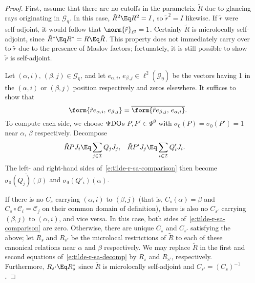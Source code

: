 \documentclass[10pt]{article}
\theoremstyle{plain}
\theoremstyle{definition}
\theoremstyle{remark}
\numberwithin{theorem}{section}
\numberwithin{example}{section}
\numberwithin{equation}{section}
\numberwithin{figure}{section}
\newcommand\PsiDO{\ensuremath{\Psi\text{\normalfont DO}}}	%
\newcommand\sC{\mathscr C}		%
\newcommand\eqml{\Eq}					%
\begin{document}
\begin{proof}	
	First, assume that there are no cutoffs in the parametrix $\tilde R$ due to glancing rays originating in $\mathcal G_\eta$.	In this case, $\tilde R^2\eqml R^2=I$, so $\tilde r^2=I$ likewise. If $\tilde r$ were self-adjoint, it would follow that $\norm{\tilde r}_{\ell^2}=1$. Certainly $\tilde R$ is microlocally self-adjoint, since $\tilde R^*\eqml R^*=R\eqml \tilde R$. This property does not immediately carry over to $\tilde r$ due to the presence of Maslov factors; fortunately, it is still possible to show $\tilde r$ is self-adjoint.
	
	Let $(\alpha,i),\,(\beta,j)\in \mathcal G_{\eta}$, and let $e_{\alpha,i},\,e_{\beta,j}\in \ell^2(\mathcal G_\eta)$ be the vectors having 1 in the $(\alpha,i)$ or $(\beta,j)$ position respectively and zeros elsewhere. It suffices to show that
	\begin{equation}
		\form{\tilde r e_{\alpha,i},\,e_{\beta,j}} = \overline{\form{\tilde r e_{\beta,j},\,e_{\alpha,i}}}.
		\label{e:tilde-r-sa-comparison}
	\end{equation}
	To compute each side, we choose \PsiDO{}s $P,P'\in\Psi^0$ with $\sigma_0(P)=\sigma_0(P')=1$ near $\alpha,\,\beta$ respectively. Decompose
	\begin{align}
		\tilde RPJ_i &\eqml \sum_{j\in\mathcal I} Q_j J_j,		&
		\tilde RP'J_j &\eqml \sum_{i\in\mathcal I} Q'_iJ_i.
		\label{e:tilde-r-sa-decomp}
	\end{align}
	The left- and right-hand sides of~\eqref{e:tilde-r-sa-comparison} then become $\overline{\sigma_0(Q_j)(\beta)}$ and $\sigma_0(Q'_i)(\alpha)$.
	
	If there is no $C_s$ carrying $(\alpha,i)$ to $(\beta,j)$ (that is, $C_s(\alpha)=\beta$ and $C_s\circ\sC_i=\sC_j$ on their common domain of definition), there is also no $C_{s'}$ carrying $(\beta,j)$ to $(\alpha,i)$, and vice versa. In this case, both sides of~\eqref{e:tilde-r-sa-comparison} are zero. Otherwise, there are unique $C_s$ and $C_{s'}$ satisfying the above; let $R_s$ and $R_{s'}$ be the microlocal restrictions of $\tilde R$ to each of these canonical relations near $\alpha$ and $\beta$ respectively. We may replace $\tilde R$ in the first and second equations of~\eqref{e:tilde-r-sa-decomp} by $R_s$ and $R_{s'}$, respectively. Furthermore, $R_{s'}\eqml R_s^*$ since $\tilde R$ is microlocally self-adjoint and $C_{s'}=(C_{s})^{-1}$.
	

\end{proof}
\end{document}
